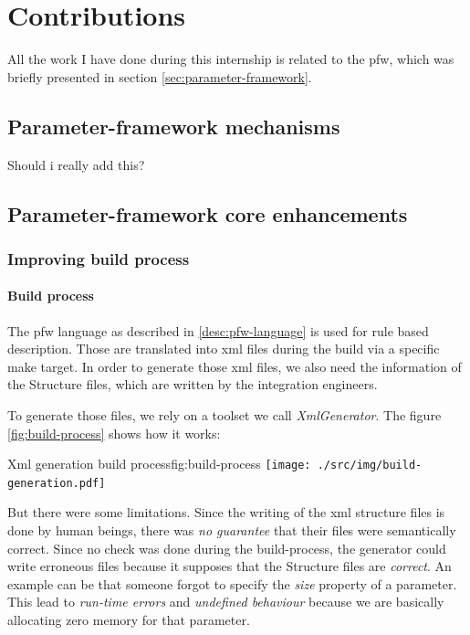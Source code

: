 \chapter{Contributions}\label{chap:contributions}

\begin{sectionIntro}
    All the work I have done during this internship is related
    to the \gls{pfw}, which was briefly presented in section \ref{sec:parameter-framework}.
\end{sectionIntro}

\section{Parameter-framework mechanisms}
Should i really add this?

\section{Parameter-framework core enhancements}

\subsection{Improving build process}
\subsubsection{Build process}
The pfw language as described in \ref{desc:pfw-language} is used for rule based
description. Those are translated into \gls{xml} files during the build via a
specific make target.  In order to generate those \gls{xml} files, we also need
the information of the Structure files, which are written by the integration
engineers.

To generate those files, we rely on a toolset we call \emph{XmlGenerator}.
The figure \ref{fig:build-process} shows how it works:

\begin{figureGraphics}{Xml generation build process}{fig:build-process}
    \texttt{[image: ./src/img/build-generation.pdf]}
\end{figureGraphics}

But there were some limitations. Since the writing of the \gls{xml} structure files is done by human beings, there was
\emph{no guarantee} that their files were semantically correct.
Since no check was done during the build-process, the generator could write erroneous files because it supposes that
the Structure files are \emph{correct}. An example can be that someone forgot to specify the \emph{size} property of a parameter.
This lead to \emph{run-time errors} and \emph{undefined behaviour} because we are basically allocating zero memory for that parameter.

